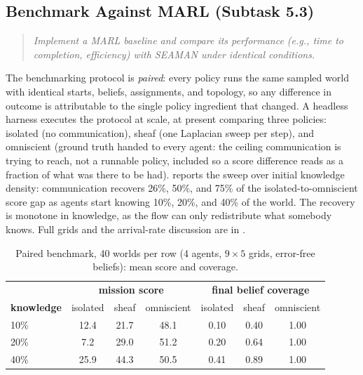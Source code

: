 \documentclass[10pt]{article}
\theoremstyle{definition}
\theoremstyle{remark}
\newcommand{\prompt}[1]{%
    \begin{quote}
        \centering\itshape #1
    \end{quote}%
}
\begin{document}
\subsection{Benchmark Against MARL (Subtask 5.3)}
\label{sec:task53}

\prompt{Implement a MARL baseline and compare its performance (e.g., time to completion, efficiency) with SEAMAN under identical conditions.}

The benchmarking protocol is \emph{paired}: every policy runs the same sampled world with identical starts, beliefs, assignments, and topology, so any difference in outcome is attributable to the single policy ingredient that changed. A headless harness executes the protocol at scale, at present comparing three policies: \textsf{isolated} (no communication), \textsf{sheaf} (one Laplacian sweep per step), and \textsf{omniscient} (ground truth handed to every agent: the ceiling communication is trying to reach, not a runnable policy, included so a score difference reads as a fraction of what was there to be had).  reports the sweep over initial knowledge density: communication recovers 26\%, 50\%, and 75\% of the isolated-to-omniscient score gap as agents start knowing 10\%, 20\%, and 40\% of the world. The recovery is monotone in knowledge, as the flow can only redistribute what somebody knows. Full grids and the arrival-rate discussion are in .

\begin{table}[h]
\centering
\small
\begin{tabular}{lccc@{\qquad}ccc}
\toprule
& \multicolumn{3}{c}{\textbf{mission score}} & \multicolumn{3}{c}{\textbf{final belief coverage}}\\
\textbf{knowledge} & \textsf{isolated} & \textsf{sheaf} & \textsf{omniscient} & \textsf{isolated} & \textsf{sheaf} & \textsf{omniscient}\\
\midrule
10\% & 12.4 & 21.7 & 48.1 & 0.10 & 0.40 & 1.00\\
20\% & \phantom{0}7.2 & 29.0 & 51.2 & 0.20 & 0.64 & 1.00\\
40\% & 25.9 & 44.3 & 50.5 & 0.41 & 0.89 & 1.00\\
\bottomrule
\end{tabular}
\caption{Paired benchmark, 40 worlds per row (4 agents, $9 \times 5$ grids, error-free beliefs): mean score and coverage.}
\label{tab:benchmark}
\end{table}
\end{document}
